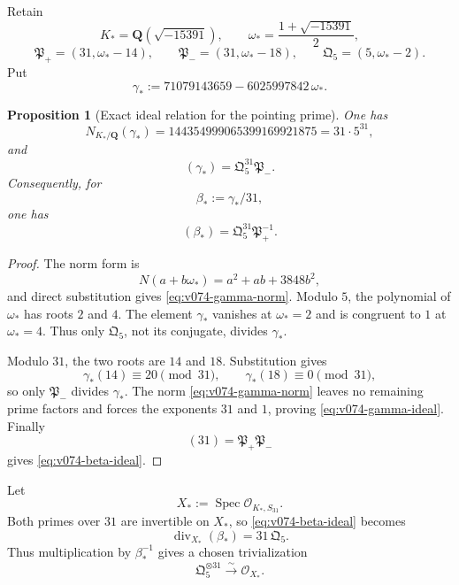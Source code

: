 \documentclass[11pt]{article}
\newtheorem{proposition}[theorem]{Proposition}
\theoremstyle{remark}
\begin{document}
Retain
\[
 K_*=\mathbf Q(\sqrt{-15391}),
 \qquad
 \omega_*=\frac{1+\sqrt{-15391}}2,
\]
\[
 \mathfrak P_+=(31,\omega_*-14),
 \qquad
 \mathfrak P_-=(31,\omega_*-18),
 \qquad
 \mathfrak Q_5=(5,\omega_*-2).
\]
Put
\begin{equation}
 \boxed{
 \gamma_*
 :=
 71079143659-6025997842\,\omega_*.
 }
 \label{eq:v074-gamma}
\end{equation}

\begin{proposition}[Exact ideal relation for the pointing prime]
\label{prop:v074-explicit-ideal-relation}
One has
\begin{equation}
 \boxed{
 N_{K_*/\mathbf Q}(\gamma_*)
 =
 144354999065399169921875
 =
 31\cdot5^{31},}
 \label{eq:v074-gamma-norm}
\end{equation}
and
\begin{equation}
 \boxed{
 (\gamma_*)
 =
 \mathfrak Q_5^{31}\mathfrak P_-.
 }
 \label{eq:v074-gamma-ideal}
\end{equation}
Consequently, for
\begin{equation}
 \boxed{\beta_*:=\gamma_*/31,}
 \label{eq:v074-beta}
\end{equation}
one has
\begin{equation}
 \boxed{
 (\beta_*)
 =
 \mathfrak Q_5^{31}\mathfrak P_+^{-1}.}
 \label{eq:v074-beta-ideal}
\end{equation}
\end{proposition}

\begin{proof}
The norm form is
\[
 N(a+b\omega_*)=a^2+ab+3848b^2,
\]
and direct substitution gives \eqref{eq:v074-gamma-norm}.
Modulo \(5\), the polynomial of \(\omega_*\) has roots \(2\) and \(4\).
The element \(\gamma_*\) vanishes at \(\omega_*=2\) and is congruent to
\(1\) at \(\omega_*=4\).  Thus only \(\mathfrak Q_5\), not its conjugate,
divides \(\gamma_*\).

Modulo \(31\), the two roots are \(14\) and \(18\).  Substitution gives
\[
 \gamma_*(14)\equiv20\pmod{31},
 \qquad
 \gamma_*(18)\equiv0\pmod{31},
\]
so only \(\mathfrak P_-\) divides \(\gamma_*\).  The norm
\eqref{eq:v074-gamma-norm} leaves no remaining prime factors and forces the
exponents \(31\) and \(1\), proving \eqref{eq:v074-gamma-ideal}.
Finally
\[
 (31)=\mathfrak P_+\mathfrak P_-
\]
gives \eqref{eq:v074-beta-ideal}.
\end{proof}

Let
\[
 X_*:=\operatorname{Spec}\mathcal O_{K_*,S_{31}}.
\]
Both primes over \(31\) are invertible on \(X_*\), so
\eqref{eq:v074-beta-ideal} becomes
\begin{equation}
 \boxed{
 \operatorname{div}_{X_*}(\beta_*)
 =
 31\,\mathfrak Q_5.}
 \label{eq:v074-beta-divisor-X}
\end{equation}
Thus multiplication by \(\beta_*^{-1}\) gives a chosen trivialization
\[
 \mathfrak Q_5^{\otimes31}\xrightarrow{\sim}\mathcal O_{X_*}.
\]
\end{document}
